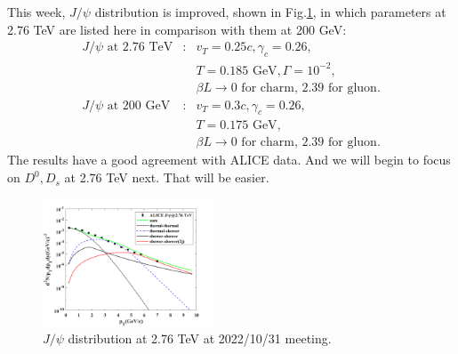 \documentclass[twocolumn,aps,superscriptaddress,nofootinbib,floatfix]{revtex4}
\begin{document}
This week, $J/\psi$ distribution is improved, shown in Fig.\ref{fig18}, in which parameters at 2.76 TeV are listed here in comparison with them at 200 GeV:
\begin{eqnarray}
	J/\psi \text{ at 2.76 TeV}&:& v_T=0.25c, \gamma_c=0.26,\\
	 &&T=0.185 \text{ GeV}, \Gamma=10^{-2},  \nonumber \\
	&&\beta L\rightarrow \text{0 for charm, 2.39 for gluon.} \nonumber\\
	J/\psi \text{ at 200 GeV}&:& v_T=0.3c, \gamma_c=0.26,\\
	&&T=0.175 \text{ GeV},  \nonumber \\
	&&\beta L\rightarrow \text{0 for charm, 2.39 for gluon.}\nonumber
\end{eqnarray}
The results have a good agreement with ALICE data. And we will begin to focus on $D^0, D_s$ at 2.76 TeV next. That will be easier.


\begin{figure}[H]
\includegraphics[width=0.45\textwidth]{Jpsi_221031.png}
\caption{$J/\psi$ distribution at 2.76 TeV at 2022/10/31 meeting.}
\label{fig18}
\end{figure}
\end{document}
